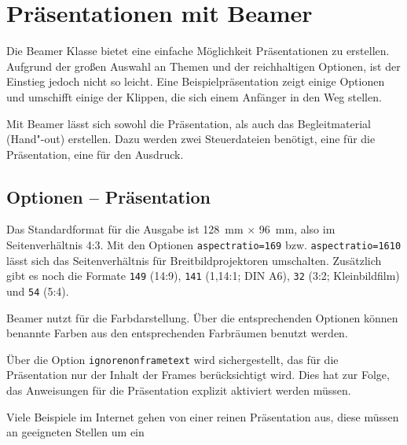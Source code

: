 \chapter{Präsentationen mit Beamer}

\noindent Die Beamer Klasse bietet eine einfache Möglichkeit Präsentationen zu
erstellen.  Aufgrund der großen Auswahl an Themen und der reichhaltigen
Optionen, ist der Einstieg jedoch nicht so leicht.  Eine
Beispielpräsentation%
zeigt einige Optionen und umschifft einige der Klippen, die sich einem 
Anfänger in den Weg stellen.

Mit Beamer lässt sich sowohl die Präsentation, als auch das Begleitmaterial
(Hand"-out) erstellen.  Dazu werden zwei Steuerdateien benötigt, eine für die
Präsentation, eine für den Ausdruck.

\section{Optionen -- Präsentation}


Das Standardformat für die Ausgabe ist 128~mm $\times$ 96~mm, also im
Seitenverhältnis 4:3. Mit den Optionen \texttt{aspectratio=169} bzw.
\texttt{aspectratio=1610} lässt sich das Seitenverhältnis für
Breitbildprojektoren umschalten.  Zusätzlich gibt es noch die Formate
\texttt{149} (14:9), \texttt{141} (1,14:1; DIN A6), \texttt{32} (3:2;
Kleinbildfilm) und \texttt{54} (5:4).

Beamer nutzt  für die Farbdarstellung. Über die
entsprechenden Optionen können benannte Farben aus den entsprechenden
Farbräumen benutzt werden.

Über die Option \texttt{ignorenonframetext} wird sichergestellt, das für die
Präsentation nur der Inhalt der Frames berücksichtigt wird. Dies hat zur
Folge, das Anweisungen für die Präsentation explizit aktiviert werden
müssen.

Viele Beispiele im Internet gehen von einer reinen Präsentation aus, diese
müssen an geeigneten Stellen um ein

